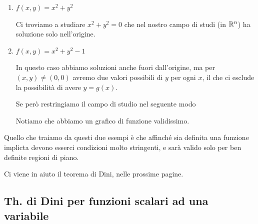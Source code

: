 \begin{enumerate}
	\item $f(x,y) = x^2 + y^2$
	
	Ci troviamo a studiare $x^2 + y^2 =0$ che nel nostro campo di studi (in $\mathbb{R}^n$) ha soluzione solo nell'origine.
	\item $f(x,y) = x^2 + y^2-1$
	
	In questo caso abbiamo soluzioni anche fuori dall'origine, ma per $(x,y) \neq (0,0)$ avremo due valori possibili di $y$ per ogni $x$, il che ci esclude la possibilità di avere $y=g(x)$.
	
	\begin{figure}[!htb]
	\end{figure}
	
	Se però restringiamo il campo di studio nel seguente modo
	\begin{figure}[!htb]
	\end{figure}
	
	Notiamo che abbiamo un grafico di funzione validissimo.
\end{enumerate}

Quello che traiamo da questi due esempi è che affinché sia definita una funzione implicta devono esserci condizioni molto stringenti, e sarà valido solo per ben definite regioni di piano. 

\bigskip

Ci viene in aiuto il teorema di Dini, nelle prossime pagine.

\newpage 
\subsection{Th. di Dini per funzioni scalari ad una variabile}

